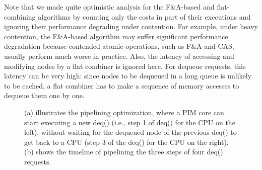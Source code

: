 \documentclass[11pt, letterpaper]{article}   	%
\begin{document}
Note that we made quite optimistic analysis for the F\&A-based and flat-combining algorithms 
by counting only the costs in part of their executions and ignoring their performance degrading under contention. 
For example, under heavy contention, the F\&A-based algorithm may suffer significant performance degradation 
because contended atomic operations, such as F\&A and CAS, usually perform much worse in practice.  
Also, the latency of accessing and modifying nodes by a flat combiner is ignored here. 
For dequeue requests, this latency can be very high: since nodes to be dequeued in a long queue is unlikely to 
be cached, a flat combiner has to make a sequence of memory accesses to dequeue them one by one.  

\begin{figure}[ht!]
\centering
{}

\caption{(a) illustrates the pipelining optimization, where a PIM core can start executing a new 
deq() (i.e., step 1 of deq() for the CPU on the left), without waiting for the dequeued node of the previous deq() 
to get back to a CPU (step 3 of the deq() for the CPU on the right). 
(b) shows the timeline of pipelining the three steps of four deq() requests.}
\label{figure:queue_pipeline}
\end{figure}
\end{document}
